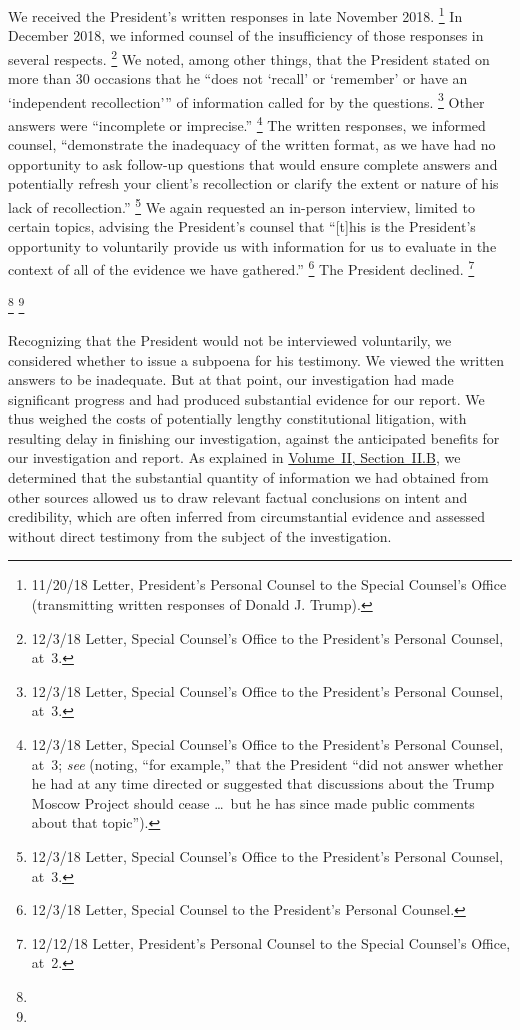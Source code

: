 We received the President's written responses in late November 2018.%
\footnote{11/20/18 Letter, President's Personal Counsel to the Special Counsel's Office (transmitting written responses of Donald J. Trump).}
In December 2018, we informed counsel of the insufficiency of those responses in several respects.%
\footnote{12/3/18 Letter, Special Counsel's Office to the President's Personal Counsel, at~3.}
We noted, among other things, that the President stated on more than 30 occasions that he ``does not `recall' or `remember' or have an `independent recollection'\thinspace'' of information called for by the questions.%
\footnote{12/3/18 Letter, Special Counsel's Office to the President's Personal Counsel, at~3.}
Other answers were ``incomplete or imprecise.''%
\footnote{12/3/18 Letter, Special Counsel's Office to the President's Personal Counsel, at~3;
\textit{see} (noting, ``for example,'' that the President ``did not answer whether he had at any time directed or suggested that discussions about the Trump Moscow Project should cease \dots\ but he has since made public comments about that topic'').}
The written responses, we informed counsel, ``demonstrate the inadequacy of the written format, as we have had no opportunity to ask follow-up questions that would ensure complete answers and potentially refresh your client's recollection or clarify the extent or nature of his lack of recollection.''%
\footnote{12/3/18 Letter, Special Counsel's Office to the President's Personal Counsel, at~3.}
We again requested an in-person interview, limited to certain topics, advising the President's counsel that ``[t]his is the President's opportunity to voluntarily provide us with information for us to evaluate in the context of all of the evidence we have gathered.''%
\footnote{12/3/18 Letter, Special Counsel to the President's Personal Counsel.}
The President declined.%
\footnote{12/12/18 Letter, President's Personal Counsel to the Special Counsel's Office, at~2.}

\footnote{}
\footnote{}

Recognizing that the President would not be interviewed voluntarily, we considered whether to issue a subpoena for his testimony.
We viewed the written answers to be inadequate.
But at that point, our investigation had made significant progress and had produced substantial evidence for our report.
We thus weighed the costs of potentially lengthy constitutional litigation, with resulting delay in finishing our investigation, against the anticipated benefits for our investigation and report.
As explained in \hyperlink{subsection.2.2.2}{Volume~II, Section~II.B}, we determined that the substantial quantity of information we had obtained from other sources allowed us to draw relevant factual conclusions on intent and credibility, which are often inferred from circumstantial evidence and assessed without direct testimony from the subject of the investigation.

